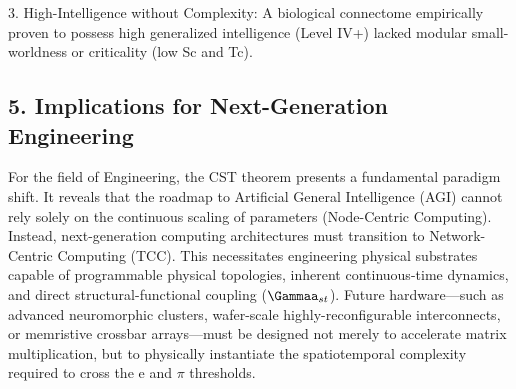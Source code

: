 \documentclass[a4paper,12pt]{article}
\begin{document}
3. High-Intelligence without Complexity: A biological connectome empirically proven to possess high generalized intelligence (Level IV+) lacked modular small-worldness or criticality (low Sc and Tc).

\subsection{5. Implications for Next-Generation Engineering}

For the field of Engineering, the CST theorem presents a fundamental paradigm shift.
It reveals that the roadmap to Artificial General Intelligence (AGI) cannot rely solely on the continuous scaling of parameters (Node-Centric Computing).
Instead, next-generation computing architectures must transition to Network-Centric Computing (TCC).
This necessitates engineering physical substrates capable of programmable physical topologies, inherent continuous-time dynamics, and direct structural-functional coupling ($\Gammaa_{st}$).
Future hardware---such as advanced neuromorphic clusters, wafer-scale highly-reconfigurable interconnects, or memristive crossbar arrays---must be designed not merely to accelerate matrix multiplication, but to physically instantiate the spatiotemporal complexity required to cross the e and  $\pi$  thresholds.
\end{document}
